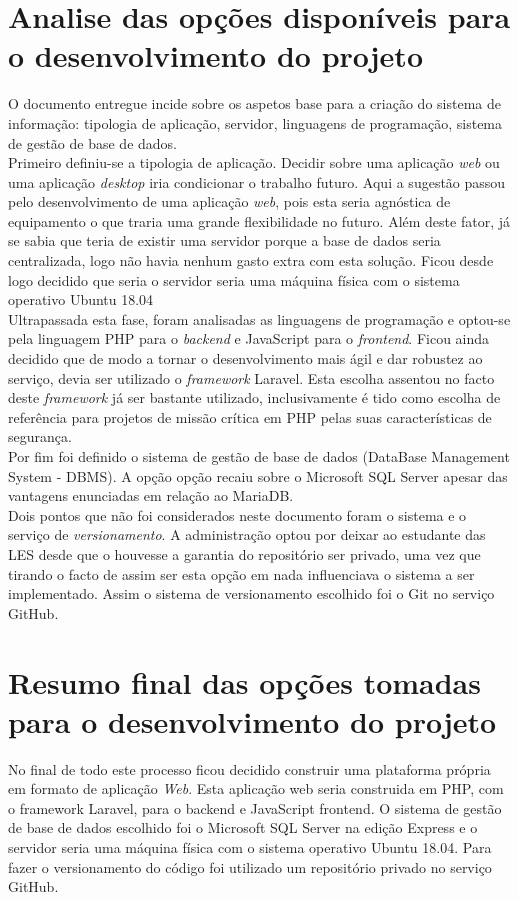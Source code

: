 \section{Analise das opções disponíveis para o desenvolvimento do projeto}
O documento entregue incide sobre os aspetos base para a criação do sistema de informação: tipologia de aplicação, servidor, linguagens de programação, sistema de gestão de base de dados.\\
Primeiro definiu-se a tipologia de aplicação. Decidir sobre uma aplicação \textit{web} ou uma aplicação \textit{desktop} iria condicionar o trabalho futuro. Aqui a sugestão passou pelo desenvolvimento de uma aplicação \textit{web}, pois esta seria agnóstica de equipamento o que traria uma grande flexibilidade no futuro. Além deste fator, já se sabia que teria de existir uma servidor porque a base de dados seria  centralizada, logo não havia nenhum gasto extra com esta solução. Ficou desde logo decidido que seria o servidor seria uma máquina física com o sistema operativo Ubuntu 18.04\\
Ultrapassada esta fase, foram analisadas as linguagens de programação e optou-se pela linguagem PHP para o \textit{backend} e JavaScript para o \textit{frontend}. Ficou ainda decidido que de modo a tornar o desenvolvimento mais ágil e dar robustez ao serviço, devia ser utilizado o \textit{framework} Laravel. Esta escolha assentou no facto deste \textit{framework} já ser bastante utilizado, inclusivamente é tido como escolha de referência para projetos de missão crítica em PHP pelas suas características de segurança\cite{Mansuri2018}.\\
Por fim foi definido o sistema de gestão de base de dados (DataBase Management System - DBMS\label{sym:DBMS}). A opção opção recaiu sobre o Microsoft SQL Server apesar das vantagens enunciadas em relação ao MariaDB.\\
Dois pontos que não foi considerados neste documento foram o sistema e o serviço de \textit{versionamento}. A administração optou por deixar ao estudante das LES desde que o houvesse a garantia do repositório ser privado, uma vez que tirando o facto de assim ser esta opção em nada influenciava o sistema a ser implementado. Assim o sistema de versionamento escolhido foi o Git no serviço GitHub.

\section{Resumo final das opções tomadas para o desenvolvimento do projeto}
No final de todo este processo ficou decidido construir uma plataforma própria em formato de aplicação \textit{Web}. Esta aplicação web seria construida em PHP, com o framework Laravel, para o backend e JavaScript frontend. O sistema de gestão de base de dados escolhido foi o Microsoft SQL Server na edição Express e o servidor seria uma máquina física com o sistema operativo Ubuntu 18.04. Para fazer o versionamento do código foi utilizado um repositório privado no serviço GitHub.